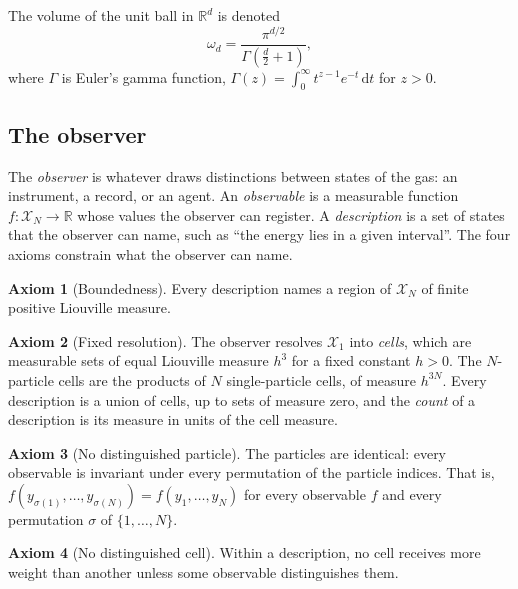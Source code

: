 \documentclass[11pt,a4paper]{article}
\theoremstyle{definition}
\newtheorem{axiom}{Axiom}
\theoremstyle{remark}
\newcommand{\R}{\mathbb{R}}
\newcommand{\X}{\mathcal{X}}
\newcommand{\dd}{\mathrm{d}}
\begin{document}
The volume of the unit ball in $\R^{d}$ is denoted
\begin{equation}
\omega_d=\frac{\pi^{d/2}}{\Gamma\!\left(\tfrac d2+1\right)},
\label{eq:omega}
\end{equation}
where $\Gamma$ is Euler's gamma function, $\Gamma(z)=\int_0^\infty t^{z-1}e^{-t}\,\dd t$ for $z>0$.

\subsection{The observer}

The \emph{observer} is whatever draws distinctions between states of the gas: an instrument, a record, or an agent.
An \emph{observable} is a measurable function $f\colon\X_N\to\R$ whose values the observer can register.
A \emph{description} is a set of states that the observer can name, such as ``the energy lies in a given interval''.
The four axioms constrain what the observer can name.

\begin{axiom}[Boundedness]
\label{ax:bounded}
Every description names a region of $\X_N$ of finite positive Liouville measure.
\end{axiom}

\begin{axiom}[Fixed resolution]
\label{ax:resolution}
The observer resolves $\X_1$ into \emph{cells}, which are measurable sets of equal Liouville measure $h^{3}$ for a fixed constant $h>0$.
The $N$-particle cells are the products of $N$ single-particle cells, of measure $h^{3N}$.
Every description is a union of cells, up to sets of measure zero, and the \emph{count} of a description is its measure in units of the cell measure.
\end{axiom}

\begin{axiom}[No distinguished particle]
\label{ax:labels}
The particles are identical: every observable is invariant under every permutation of the particle indices.
That is, $f(y_{\sigma(1)},\dots,y_{\sigma(N)})=f(y_1,\dots,y_N)$ for every observable $f$ and every permutation $\sigma$ of $\{1,\dots,N\}$.
\end{axiom}

\begin{axiom}[No distinguished cell]
\label{ax:cells}
Within a description, no cell receives more weight than another unless some observable distinguishes them.
\end{axiom}
\end{document}
